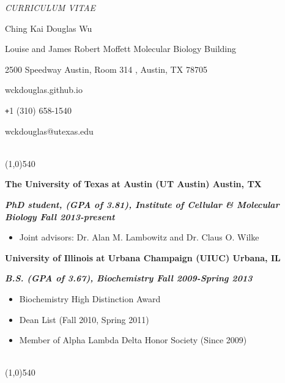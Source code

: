 \documentclass[dvips,11pt]{article}
\begin{document}
\centerline{\it \small CURRICULUM VITAE}
\vspace{2mm}
\centerline{\Large Ching Kai Douglas Wu}
\centerline{ Louise and James Robert Moffett Molecular Biology Building}
\centerline{2500 Speedway Austin, Room 314 , Austin, TX 78705}
\centerline{wckdouglas.github.io}
\centerline{\texttt{+}1 (310) 658-1540}
\centerline{wckdouglas@utexas.edu}
\vspace{.5mm}

 \vspace{-2.5mm}
\\\noindent \line(1,0){540}\\
\noindent \centerline{\bf The University of Texas at Austin (UT Austin) \hfill Austin, TX}
\noindent \centerline{\textit{\textbf{PhD student, (GPA of 3.81), Institute of Cellular \& Molecular Biology \hfill Fall 2013-present}}}
\vspace{-7mm}
\begin{spacing}{0.1}
\begin{itemize} \parskip 0pt \parsep 0pt
	\setlength{\itemsep}{0pt}
	\item Joint advisors: Dr. Alan M. Lambowitz and Dr. Claus O. Wilke
	\end{itemize}
\end{spacing}
\vspace{1mm}
\noindent \centerline{\bf University of Illinois at Urbana Champaign (UIUC) \hfill Urbana, IL}
\noindent \centerline{{\textit{\textbf{B.S. (GPA of 3.67), Biochemistry \hfill Fall 2009-Spring 2013}}}}
\begin{spacing}{0.2}
\vspace{-2.5mm}
\begin{itemize} \itemsep 1pt \parskip 0pt \parsep 0pt
	\setlength{\itemsep}{0pt}
	\item Biochemistry High Distinction Award
	\item Dean List (Fall 2010, Spring 2011)
	\item Member of Alpha Lambda Delta Honor Society (Since 2009)
	\end{itemize}
\end{spacing}
\vspace{+4mm}

 \vspace{-2mm}
\\\noindent \line(1,0){540}\\
\vspace{-5mm}
\end{document}
